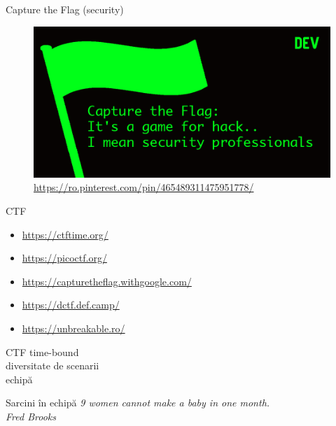 \documentclass{simple}
\begin{document}
\begin{frame}{Capture the Flag (security)}
  \begin{figure}
    \centering
    \includegraphics[width=\textwidth]{img/security-ctf.png} \\
    \tiny{\url{https://ro.pinterest.com/pin/465489311475951778/}}
  \end{figure}
\end{frame}

\begin{frame}{CTF}
  \begin{itemize}
    \item \url{https://ctftime.org/}
    \item \url{https://picoctf.org/}
    \item \url{https://capturetheflag.withgoogle.com/}
    \item \url{https://dctf.def.camp/}
    \item \url{https://unbreakable.ro/}
  \end{itemize}
\end{frame}

\begin{frame}{CTF}
  \centering
  \pause
  \vspace{0.5cm}
  \Large{time-bound} \\
  \pause
  \vspace{0.5cm}
  \Large{diversitate de scenarii} \\
  \pause
  \vspace{0.5cm}
  \Large{echipă}
\end{frame}

\begin{frame}{Sarcini în echipă}
  \centering
  \pause
  \textit{9 women cannot make a baby in one month.} \\
  \vspace{3mm}
  \hfill \textit{Fred Brooks} \\
\end{frame}
\end{document}
